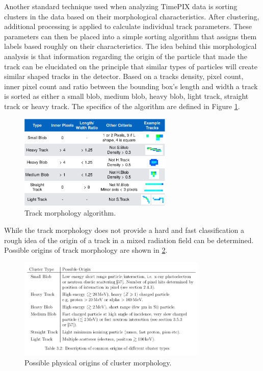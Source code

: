Another standard technique used when analyzing TimePIX data is sorting clusters in the data based on their morphological characteristics. After clustering, additional processing is applied to calculate individual track parameters. These parameters can then be placed into a simple sorting algorithm that assigns them labels based roughly on their characteristics. The idea behind this morphological analysis is that information regarding the origin of the particle that made the track can be elucidated on the principle that similar types of particles will create similar shaped tracks in the detector. Based on a tracks density, pixel count, inner pixel count and ratio between the bounding box's length and width a track is sorted as either a small blob, medium blob, heavy blob, light track, straight track or heavy track. The specifics of the algorithm are defined in Figure \ref{stuart_algo}.

\begin{figure}[H]
	\begin{center}
	\includegraphics[width=0.65\textwidth]{figures/stuartgraphic.pdf}
	\caption{Track morphology algorithm.\cite{stuartalgo}}
	\label{stuart_algo}
	\end{center}
\end{figure}

While the track morphology does not provide a hard and fast classification a rough idea of the origin of a track in a mixed radiation field can be determined. Possible origins of track morphology are shown in \ref{track_morphology}.

\begin{figure}[H]
	\begin{center}
	\includegraphics[width=0.8\textwidth]{figures/cluster_types.png}
	\caption{Possible physical origins of cluster morphology.\cite{stuartthesis}}
	\label{track_morphology}
	\end{center}
\end{figure}
